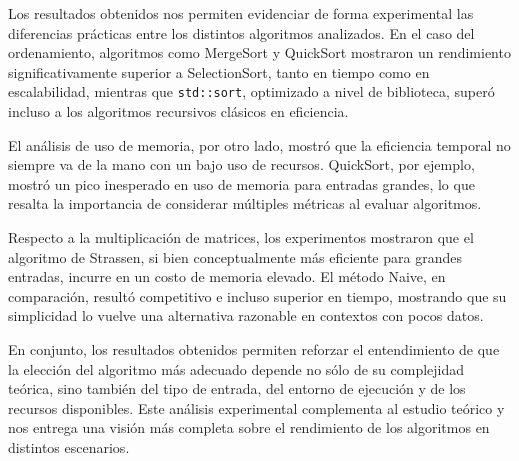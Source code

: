 Los resultados obtenidos nos permiten evidenciar de forma experimental las diferencias prácticas entre los distintos algoritmos analizados. En el caso del ordenamiento, algoritmos como MergeSort y QuickSort mostraron un rendimiento significativamente superior a SelectionSort, tanto en tiempo como en escalabilidad, mientras que \texttt{std::sort}, optimizado a nivel de biblioteca, superó incluso a los algoritmos recursivos clásicos en eficiencia.

El análisis de uso de memoria, por otro lado, mostró que la eficiencia temporal no siempre va de la mano con un bajo uso de recursos. QuickSort, por ejemplo, mostró un pico inesperado en uso de memoria para entradas grandes, lo que resalta la importancia de considerar múltiples métricas al evaluar algoritmos.

Respecto a la multiplicación de matrices, los experimentos mostraron que el algoritmo de Strassen, si bien conceptualmente más eficiente para grandes entradas, incurre en un costo de memoria elevado. El método Naive, en comparación, resultó competitivo e incluso superior en tiempo, mostrando que su simplicidad lo vuelve una alternativa razonable en contextos con pocos datos.

En conjunto, los resultados obtenidos permiten reforzar el entendimiento de que la elección del algoritmo más adecuado depende no sólo de su complejidad teórica, sino también del tipo de entrada, del entorno de ejecución y de los recursos disponibles. Este análisis experimental complementa al estudio teórico y nos entrega una visión más completa sobre el rendimiento de los algoritmos en distintos escenarios.

